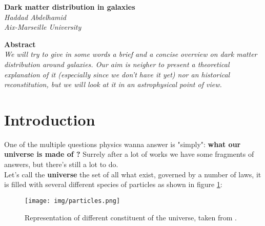 \documentclass[12pt, letterpaper, twocolumn]{article}
\begin{document}
\pagestyle{plain}

\begin{center}
\textbf{\large{Dark matter distribution in galaxies}}\\ \textit{Haddad Abdelhamid\\Aix-Marseille University}
\end{center}

\begin{center}
\noindent\textbf{Abstract}\\
\textit{We will try to give in some words a brief and a concise overview on dark matter distribution around galaxies. Our aim is neigher to present a theoretical explanation of it (especially since we don't have it yet) nor an historical  reconstitution, but we will look at it in an astrophysical point of view.}
\end{center}


\section{\textbf{Introduction}}
One of the multiple questions physics wanna answer is "simply": \textbf{what our universe is made of ?} Surrely after a lot of works we have some fragments of answers, but there's still a lot to do. 
\\Let's call the \textbf{universe} the set of all what exist, governed by a number of laws, it is filled with several different species of particles as shown in figure \ref{baumann}: 

\begin{figure}[ht]
    \centering
    \texttt{[image: img/particles.png]}
    \caption{Representation of different constituent of the universe, taken from \cite{baumann2018}.}
    \label{baumann}
\end{figure}
\end{document}
